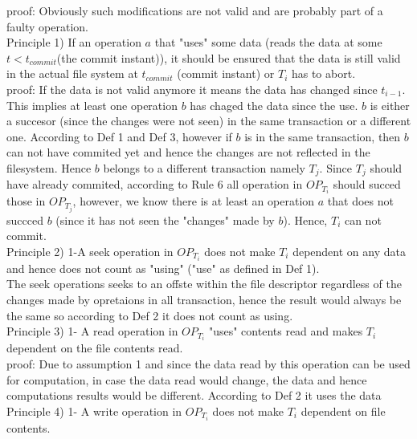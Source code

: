 \documentclass[a4paper, 11pt]{article}
\begin{document}
proof: Obviously such modifications are not valid and are probably part of a faulty operation.\\


Principle 1) If an operation $a$ that "uses" some data (reads the data at some $t < t_{commit}$(the commit instant)), it should be ensured that the data is still valid in the actual file system at $t_{commit}$ (commit instant) or $T_i$ has to abort.\\

proof: If the data is not valid anymore it means the data has changed since $t_{i-1}$. This implies at least one operation $b$ has chaged the data since the use. $b$ is either a succesor (since the changes were not seen) in the same transaction or a different one. According to Def 1 and Def 3, however if $b$ is in the same transaction, then $b$ can not have commited yet and hence the changes are not reflected in the filesystem. Hence $b$ belongs to a different transaction namely $T_j$. Since $T_j$ should have already commited, according to Rule 6 all operation in $OP_{T_i}$ should succed those in $OP_{T_j}$, however, we know there is at least an operation $a$ that does not succced $b$ (since it has not seen the "changes" made by $b$). Hence, $T_i$ can not commit.\\


Principle 2) 1-A seek operation in $OP_{T_i}$ does not make $T_i$ dependent on any data and hence does not count as "using" ("use" as defined in Def 1).\\

The seek operations seeks to an offste within the file descriptor regardless of the changes made by opretaions in all transaction, hence the result would always be the same so according to Def 2 it does not count as using.\\ 

Principle 3) 1- A read operation in $OP_{T_i}$ "uses" contents read and makes $T_i$ dependent on the file contents read.\\

proof: Due to assumption 1 and since the data read by this operation can be used for computation, in case the data read would change, the data and hence computations results would be different. According to Def 2 it uses the data\\

Principle 4) 1- A write operation in $OP_{T_i}$ does not make $T_i$ dependent on file contents.\\   
\end{document}
